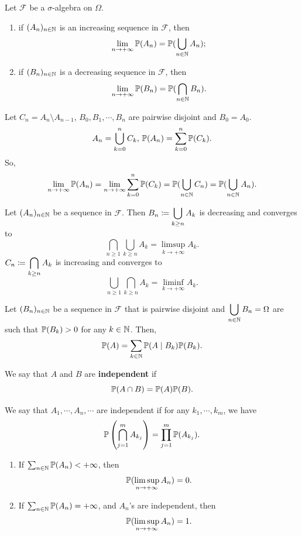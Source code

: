 \begin{theorembox}
    Let $\mathcal{F}$ be a $\sigma$-algebra on $\Omega$.
    \begin{enumerate}
        \item if $(A_n)_{n\in \mathbb{N}}$ is an increasing sequence in $\mathcal{F}$, then
        $$\lim_{n \rightarrow +\infty} \mathbb{P}(A_n) = \mathbb{P}(\bigcup_{n \in \mathbb{N}} A_n);$$
        \item if $(B_n)_{n\in \mathbb{N}}$ is a decreasing sequence in $\mathcal{F}$, then
        $$\lim_{n \rightarrow +\infty} \mathbb{P}(B_n) = \mathbb{P}(\bigcap_{n \in \mathbb{N}} B_n).$$
    \end{enumerate}
\end{theorembox}
\begin{proofbox}
    Let $C_n = A_n \setminus A_{n-1}$, $B_0, B_1, \cdots, B_n$ are pairwise disjoint and $B_0 = A_0$.
    $$A_n = \bigcup_{k = 0}^{n} C_{k}, \, \mathbb{P}(A_n) = \sum_{k = 0}^{n} \mathbb{P}(C_k).$$
    So,
    $$\lim_{n \rightarrow +\infty} \mathbb{P}(A_n) = \lim_{n \rightarrow +\infty} \sum_{k = 0}^{n} \mathbb{P}(C_k) = \mathbb{P}(\bigcup_{n \in \mathbb{N}} C_n) = \mathbb{P}(\bigcup_{n \in \mathbb{N}} A_n).$$
\end{proofbox}

\begin{remarkbox}
    Let $(A_n)_{n\in \mathbb{N}}$ be a sequence in $\mathcal{F}$.
    Then $B_n \coloneq \displaystyle \bigcup_{k \ge n} A_k$ is decreasing and converges to
    $$\bigcap_{n \ge 1} \bigcup_{k \ge n} A_{k} = \limsup_{k \rightarrow +\infty} A_{k}.$$
    $C_n \coloneq \displaystyle \bigcap_{k \ge n} A_{k}$ is increasing and converges to
    $$\bigcup_{n \ge 1} \bigcap_{k \ge n} A_{k} = \liminf_{k \rightarrow +\infty} A_{k}.$$
\end{remarkbox}

\begin{propositionbox}
    Let $(B_n)_{n \in \mathbb{N}}$ be a sequence in $\mathcal{F}$ that is pairwise disjoint and $\displaystyle \bigcup_{n \in \mathbb{N}} B_n =\Omega$
    are such that $\mathbb{P}(B_{k}) > 0$ for any $k \in \mathbb{N}$.
    Then,
    $$\mathbb{P}(A) = \sum_{k \in \mathbb{N}} \mathbb{P}(A \mid B_{k}) \mathbb{P}(B_{k}).$$
\end{propositionbox}

\begin{definitionbox}[Independence]
    We say that $A$ and $B$ are \textbf{independent} if
    $$\mathbb{P}(A \cap B) = \mathbb{P}(A) \mathbb{P}(B).$$
    
    We say that $A_1, \cdots, A_n, \cdots$ are independent if for any $k_1, \cdots, k_m$, we have
    $$\mathbb{P}\left(\bigcap_{j = 1}^{m} A_{k_j}\right) = \prod_{j = 1}^{m} \mathbb{P}(A_{k_j}).$$
\end{definitionbox}

\begin{propositionbox}\label{prop:borel-cantelli}
    \quad
    \begin{enumerate}
        \item If $\sum_{n \in \mathbb{N}} \mathbb{P}(A_{n}) < +\infty$, then
        $$\mathbb{P}(\limsup_{n \rightarrow +\infty} A_n) = 0.$$
        \item If $\sum_{n \in \mathbb{N}} \mathbb{P}(A_{n}) = +\infty$, and $A_n$'s are independent, then
        $$\mathbb{P}(\limsup_{n \rightarrow +\infty} A_n) = 1.$$
    \end{enumerate}
\end{propositionbox}
